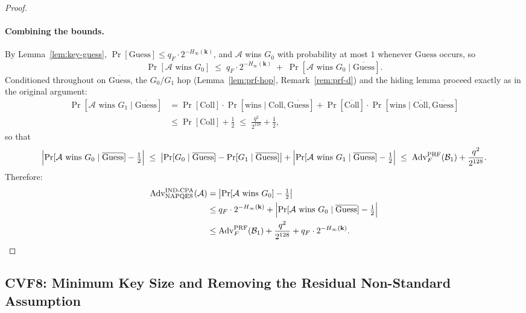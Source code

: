 \documentclass[11pt,a4paper]{article}
\begin{document}
\begin{proof}
\paragraph{Combining the bounds.}
By Lemma~\ref{lem:key-guess}, $\Pr[\mathrm{Guess}]\leq q_F\cdot 2^{-H_\infty(\mathbf{k})}$,
and $\mathcal{A}$ wins $G_0$ with probability at most $1$ whenever
$\mathrm{Guess}$ occurs, so
\[
  \Pr[\mathcal{A}\text{ wins }G_0]
  \;\leq\;
  q_F\cdot 2^{-H_\infty(\mathbf{k})}
  \;+\;
  \Pr[\mathcal{A}\text{ wins }G_0 \mid \overline{\mathrm{Guess}}].
\]
Conditioned throughout on $\overline{\mathrm{Guess}}$, the $G_0$/$G_1$ hop
(Lemma~\ref{lem:prf-hop}, Remark~\ref{rem:prf-d}) and the hiding lemma
proceed exactly as in the original argument:
\begin{align*}
  \Pr[\mathcal{A}\text{ wins }G_1 \mid \overline{\mathrm{Guess}}]
  &= \Pr[\mathrm{Coll}]\cdot\Pr[\text{wins}\mid\mathrm{Coll},\overline{\mathrm{Guess}}]
     +\Pr[\overline{\mathrm{Coll}}]\cdot\Pr[\text{wins}\mid\overline{\mathrm{Coll}},\overline{\mathrm{Guess}}]\\
  &\leq \Pr[\mathrm{Coll}]+\tfrac{1}{2}
   \;\leq\; \frac{q^2}{2^{128}}+\tfrac{1}{2},
\end{align*}
so that
\[
  \Bigl|\Pr[\mathcal{A}\text{ wins }G_0 \mid \overline{\mathrm{Guess}}]-\tfrac{1}{2}\Bigr|
  \;\leq\;
  \bigl|\Pr[G_0\mid\overline{\mathrm{Guess}}]-\Pr[G_1\mid\overline{\mathrm{Guess}}]\bigr|
  +\Bigl|\Pr[\mathcal{A}\text{ wins }G_1\mid\overline{\mathrm{Guess}}]-\tfrac{1}{2}\Bigr|
  \;\leq\;
  \mathrm{Adv}^{\mathrm{PRF}}_{F}(\mathcal{B}_1) + \frac{q^2}{2^{128}}.
\]
Therefore:
\begin{align*}
  \mathrm{Adv}^{\mathrm{IND\text{-}CPA}}_{\mathrm{NAPQES}}(\mathcal{A})
  &= \bigl|\Pr[\mathcal{A}\text{ wins }G_0]-\tfrac{1}{2}\bigr| \\
  &\leq q_F\cdot 2^{-H_\infty(\mathbf{k})}
       + \Bigl|\Pr[\mathcal{A}\text{ wins }G_0 \mid \overline{\mathrm{Guess}}]-\tfrac{1}{2}\Bigr| \\
  &\leq \mathrm{Adv}^{\mathrm{PRF}}_{F}(\mathcal{B}_1) + \frac{q^2}{2^{128}}
       + q_F\cdot 2^{-H_\infty(\mathbf{k})}.
    \qedhere
\end{align*}
\end{proof}

\subsection{CVF8: Minimum Key Size and Removing the Residual Non-Standard Assumption}
\label{sec:cvf8-fix}
\end{document}
